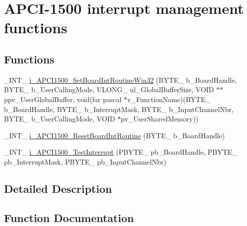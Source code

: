 \hypertarget{group___interrupt_cmp_d_l_l}{}\section{A\+P\+C\+I-\/1500 interrupt management functions}
\label{group___interrupt_cmp_d_l_l}
\subsection*{Functions}
\begin{DoxyCompactItemize}
\item 
\+\_\+\+I\+N\+T\+\_\+ \mbox{\hyperlink{group___interrupt_cmp_d_l_l_gaf4db3e3a1bfc241d10bb23b72ef0b026}{i\+\_\+\+A\+P\+C\+I1500\+\_\+\+Set\+Board\+Int\+Routine\+Win32}} (B\+Y\+T\+E\+\_\+ b\+\_\+\+Board\+Handle, B\+Y\+T\+E\+\_\+ b\+\_\+\+User\+Calling\+Mode, U\+L\+O\+N\+G\+\_\+ ul\+\_\+\+Global\+Buffer\+Size, V\+O\+ID $\ast$$\ast$ppv\+\_\+\+User\+Global\+Buffer, void(far pascal $\ast$v\+\_\+\+Function\+Name)(B\+Y\+T\+E\+\_\+ b\+\_\+\+Board\+Handle, B\+Y\+T\+E\+\_\+ b\+\_\+\+Interrupt\+Mask, B\+Y\+T\+E\+\_\+ b\+\_\+\+Input\+Channel\+Nbr, B\+Y\+T\+E\+\_\+ b\+\_\+\+User\+Calling\+Mode, V\+O\+ID $\ast$pv\+\_\+\+User\+Shared\+Memory))
\item 
\+\_\+\+I\+N\+T\+\_\+ \mbox{\hyperlink{group___interrupt_cmp_d_l_l_ga7008f6661610d03213866bdddc19045d}{i\+\_\+\+A\+P\+C\+I1500\+\_\+\+Reset\+Board\+Int\+Routine}} (B\+Y\+T\+E\+\_\+ b\+\_\+\+Board\+Handle)
\item 
\+\_\+\+I\+N\+T\+\_\+ \mbox{\hyperlink{group___interrupt_cmp_d_l_l_gaba31b5cf8d6cd80e0065ebf36f6d3b5d}{i\+\_\+\+A\+P\+C\+I1500\+\_\+\+Test\+Interrupt}} (P\+B\+Y\+T\+E\+\_\+ pb\+\_\+\+Board\+Handle, P\+B\+Y\+T\+E\+\_\+ pb\+\_\+\+Interrupt\+Mask, P\+B\+Y\+T\+E\+\_\+ pb\+\_\+\+Input\+Channel\+Nbr)
\end{DoxyCompactItemize}


\subsection{Detailed Description}


\subsection{Function Documentation}
\mbox{\label{group___interrupt_cmp_d_l_l_gaf4db3e3a1bfc241d10bb23b72ef0b026}} 
